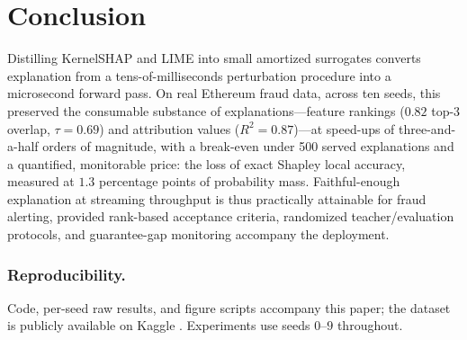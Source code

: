 \documentclass[runningheads]{llncs}
\begin{document}
\section{Conclusion}
Distilling KernelSHAP and LIME into small amortized surrogates converts
explanation from a tens-of-milliseconds perturbation procedure into a
microsecond forward pass. On real Ethereum fraud data, across ten seeds,
this preserved the consumable substance of explanations---feature
rankings ($0.82$ top-3 overlap, $\tau=0.69$) and attribution values
($R^2=0.87$)---at speed-ups of three-and-a-half orders of magnitude, with
a break-even under 500 served explanations and a quantified, monitorable
price: the loss of exact Shapley local accuracy, measured at
$1.3$ percentage points of probability mass. Faithful-enough explanation
at streaming throughput is thus practically attainable for fraud
alerting, provided rank-based acceptance criteria, randomized
teacher/evaluation protocols, and guarantee-gap monitoring accompany the
deployment.

\subsubsection{Reproducibility.} Code, per-seed raw results, and figure
scripts accompany this paper; the dataset is publicly available on Kaggle
\cite{farrugia2020}. Experiments use seeds $0$--$9$ throughout.
\end{document}
